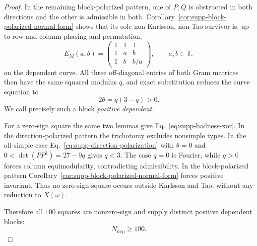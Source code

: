 \documentclass[aps,prx,reprint,nofootinbib,twoside,superscriptaddress,longbibliography,floatfix]{revtex4-2}
\theoremstyle{definition}
\newcommand{\T}{\mathbb T}
\begin{document}
\begin{proof}
In the remaining block-polarized pattern, one of $P,Q$ is {obstructed in both directions and the other is admissible in both}. Corollary~\ref{cor:supp-block-polarized-normal-form} shows that its sole non-Karlsson, non-Tao survivor is, up to row and column phasing and permutation,
\begin{equation}
E_M(a,b)=
\begin{pmatrix}1&1&1\\1&a&b\\1&b&b/a\end{pmatrix},
\qquad a,b\in\T,
\label{eq:supp-dependent-normal-form}
\end{equation}
on the dependent curve.  All three off-diagonal entries of both Gram matrices then have the same squared modulus $q$, and exact substitution reduces the curve equation to
\begin{equation}
2\theta=q(3-q)>0.
\label{eq:supp-dependent-weight}
\end{equation}
We call precisely such a block \emph{positive dependent}.

{For a zero-sign square the same two lemmas give Eq.~\eqref{eq:supp-badness-xor}.  In the direction-polarized pattern the trichotomy excludes nonsimple types. In the all-simple case Eq.~\eqref{eq:supp-direction-polarization} with $\theta=0$ and $0<\det(PP^\dagger)=27-9q$ gives $q<3$. The case $q=0$ is Fourier, while $q>0$ forces column equimodularity, contradicting admissibility. In the block-polarized pattern Corollary~\ref{cor:supp-block-polarized-normal-form} forces positive invariant.  Thus no zero-sign square occurs outside Karlsson and Tao, without any reduction to $X(\omega)$.}

{Therefore all $100$ squares are nonzero-sign and supply distinct positive dependent blocks:}
\begin{equation}
N_{\mathrm{dep}}\ge100.
\label{eq:supp-dependent-lower}
\end{equation}


\end{proof}
\end{document}

